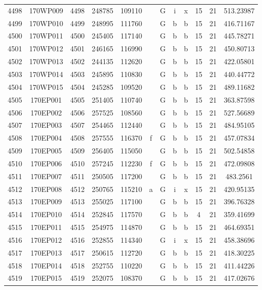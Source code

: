 \begin{tabular}{|*{12}{c|}}
4498 & 170WP009 & 4498 & 248785 & 109110 &  & G & i & x & 15 & 21 & 513.23987 \\ 
4499 & 170WP010 & 4499 & 248995 & 111760 &  & G & b & b & 15 & 21 & 416.71167 \\ 
4500 & 170WP011 & 4500 & 245405 & 117140 &  & G & b & b & 15 & 21 & 445.78271 \\ 
4501 & 170WP012 & 4501 & 246165 & 116990 &  & G & b & b & 15 & 21 & 450.80713 \\ 
4502 & 170WP013 & 4502 & 244135 & 112620 &  & G & b & b & 15 & 21 & 422.05801 \\ 
4503 & 170WP014 & 4503 & 245895 & 110830 &  & G & b & b & 15 & 21 & 440.44772 \\ 
4504 & 170WP015 & 4504 & 245285 & 109520 &  & G & b & b & 15 & 21 & 489.11682 \\ 
4505 & 170EP001 & 4505 & 251405 & 110740 &  & G & b & b & 15 & 21 & 363.87598 \\ 
4506 & 170EP002 & 4506 & 257525 & 108560 &  & G & b & b & 15 & 21 & 527.56689 \\ 
4507 & 170EP003 & 4507 & 254465 & 112440 &  & G & b & b & 15 & 21 & 484.95105 \\ 
4508 & 170EP004 & 4508 & 257555 & 116370 & f & G & b & b & 15 & 21 & 457.07834 \\ 
4509 & 170EP005 & 4509 & 256405 & 115050 &  & G & b & b & 15 & 21 & 502.54858 \\ 
4510 & 170EP006 & 4510 & 257245 & 112230 & f & G & b & b & 15 & 21 & 472.09808 \\ 
4511 & 170EP007 & 4511 & 250505 & 117200 &  & G & b & b & 15 & 21 & 483.2561 \\ 
4512 & 170EP008 & 4512 & 250765 & 115210 & a & G & i & x & 15 & 21 & 420.95135 \\ 
4513 & 170EP009 & 4513 & 255025 & 117100 &  & G & b & b & 15 & 21 & 396.76328 \\ 
4514 & 170EP010 & 4514 & 252845 & 117570 &  & G & b & b & 4 & 21 & 359.41699 \\ 
4515 & 170EP011 & 4515 & 254975 & 114870 &  & G & b & b & 15 & 21 & 464.69351 \\ 
4516 & 170EP012 & 4516 & 252855 & 114340 &  & G & i & x & 15 & 21 & 458.38696 \\ 
4517 & 170EP013 & 4517 & 250615 & 112720 &  & G & b & b & 15 & 21 & 418.30225 \\ 
4518 & 170EP014 & 4518 & 252755 & 110220 &  & G & b & b & 15 & 21 & 411.44226 \\ 
4519 & 170EP015 & 4519 & 252075 & 108370 &  & G & b & b & 15 & 21 & 417.02676 \\ 

\end{tabular}
